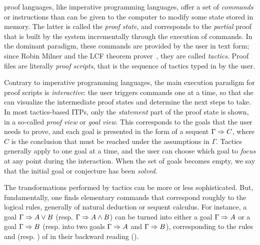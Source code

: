 \begin{description}[labelsep=0pt]
  \item[Imperative~]proof languages, like imperative programming languages,
  offer a set of \emph{commands} or instructions than can be given to the
  computer to modify some state stored in memory. The latter is called the
  \emph{proof state}, and corresponds to the \emph{partial} proof that is built
  by the system incrementally through the execution of commands. In the dominant
  paradigm, these commands are provided by the user in text form; since Robin
  Milner and the LCF theorem prover~, they
  are called \emph{tactics}. Proof files are literally \emph{proof scripts},
  that is the sequence of tactics typed in by the user.
  
  Contrary to imperative programming languages, the main execution paradigm for
  proof scripts is \emph{interactive}: the user triggers commands one at a time,
  so that she can visualize the intermediate proof states and determine the next
  steps to take. In most tactics-based ITPs,
  only the \emph{statement} part of the proof state is shown, in a so-called
  \emph{proof view} or \emph{goal view}. This corresponds to the goals that the
  user needs to prove, and each goal is presented in the form of a sequent
  $\Gamma \Rightarrow C$, where $C$ is the conclusion that must be reached under the
  assumptions in $\Gamma$. Tactics generally apply to one goal at a time, and
  the user can choose which goal to \emph{focus} at any point during the
  interaction. When the set of goals becomes empty, we say that the initial goal
  or conjecture has been \emph{solved}.

  The transformations performed by tactics can be more or less sophisticated.
  But, fundamentally, one finds elementary commands that correspond roughly to
  the logical rules, generally of natural deduction or sequent calculus. For
  instance, a goal $\Gamma\Rightarrow A\lor B$ (resp. $\Gamma\Rightarrow A\land B$) can be
  turned into either a goal $\Gamma\Rightarrow A$ or a goal $\Gamma\Rightarrow B$ (resp. into
  two goals $\Gamma\Rightarrow A$ and $\Gamma\Rightarrow B$), corresponding to the rules
   and  (resp. ) of  in their
  backward reading ().


\end{description}

